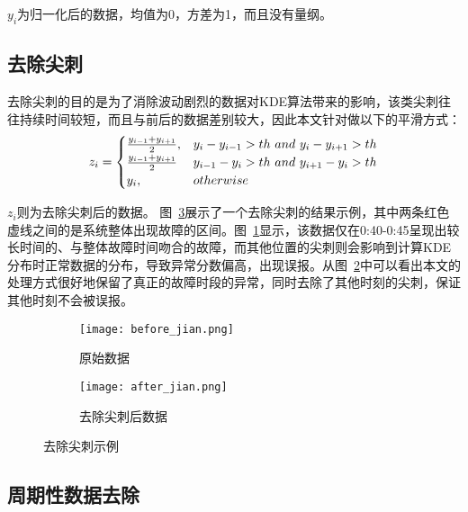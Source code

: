 $y_i$为归一化后的数据，均值为0，方差为1，而且没有量纲。
\subsection{去除尖刺}
去除尖刺的目的是为了消除波动剧烈的数据对KDE算法带来的影响，该类尖刺往往持续时间较短，而且与前后的数据差别较大，因此本文针对做以下的平滑方式：
\begin{equation*}
z_i = \begin{cases} \frac{y_{i-1} + y_{i+1}}{2}, & y_i - y_{i-1} > th\ and\ y_i - y_{i+1} > th \cr \frac{y_{i-1} + y_{i+1}}{2} & y_{i-1} - y_i > th\ and\ y_{i+1} - y_i > th \cr y_i, & otherwise  \end{cases}
\end{equation*}

$z_i$则为去除尖刺后的数据。
图~\ref{fig:smooth}展示了一个去除尖刺的结果示例，其中两条红色虚线之间的是系统整体出现故障的区间。图~\ref{fig:smooth:left}显示，该数据仅在0:40-0:45呈现出较长时间的、与整体故障时间吻合的故障，而其他位置的尖刺则会影响到计算KDE分布时正常数据的分布，导致异常分数偏高，出现误报。从图~\ref{fig:smooth:right}中可以看出本文的处理方式很好地保留了真正的故障时段的异常，同时去除了其他时刻的尖刺，保证其他时刻不会被误报。

\begin{figure}[htbp]
  \begin{subfigure}[b]{0.5\textwidth}
    \begin{minipage}[t]{\linewidth}
    \centering
    \texttt{[image: before\_jian.png]}
    \caption{原始数据}
    \label{fig:smooth:left}
    \end{minipage}
  \end{subfigure}
  \begin{subfigure}[b]{0.5\textwidth}
    \begin{minipage}[t]{\linewidth}
    \centering
    \texttt{[image: after\_jian.png]}
    \caption{去除尖刺后数据}
    \label{fig:smooth:right}
    \end{minipage}
  \end{subfigure}
    \caption{去除尖刺示例}
    \label{fig:smooth}
\end{figure}

\subsection{周期性数据去除}



